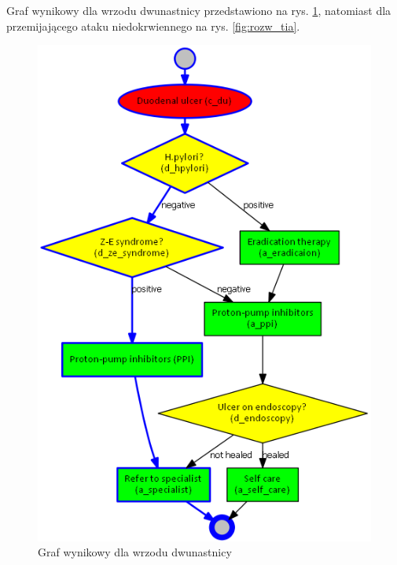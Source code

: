 Graf wynikowy dla wrzodu dwunastnicy przedstawiono na rys. \ref{fig:rozw_du}, natomiast dla przemijającego ataku niedokrwiennego na rys. \ref{fig:rozw_tia}.
\begin{figure}[H]
\centering
\includegraphics[scale=0.5]{img/rozwiazanie1du.png}
\caption{Graf wynikowy dla wrzodu dwunastnicy}
\label{fig:rozw_du}
\end{figure}
